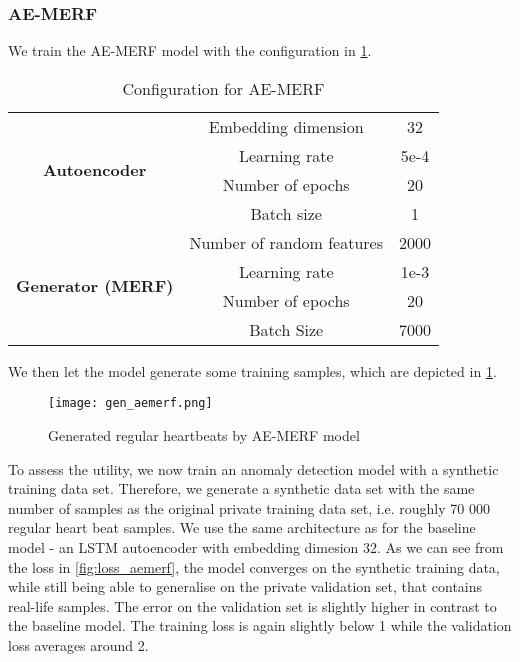 \subsubsection*{AE-MERF}
We train the AE-MERF model with the configuration in \cref{tab:ae_merf_config}.
\begin{table}[H]
    \centering
    \begin{tabular}{|c|c|c|}
        \hline
        \multirow{4}{*}{\textbf{Autoencoder}}& Embedding dimension & 32 \\ 
                                    & Learning rate & 5e-4 \\
                                    & Number of epochs& 20\\
                                    & Batch size & 1\\
        \hline
        \multirow{4}{*}{\textbf{Generator (MERF)}} & Number of random features & 2000 \\
                                        & Learning rate & 1e-3\\
                                        & Number of epochs & 20\\
                                        & Batch Size & 7000 \\
        \hline
    \end{tabular}
    \caption{Configuration for AE-MERF}
    \label{tab:ae_merf_config}
\end{table}
We then let the model generate some training samples, which are depicted in \cref{fig:aemerf_samples}.

\begin{figure}[h]
    \centering
    \texttt{[image: gen\_aemerf.png]}
    \caption{Generated regular heartbeats by AE-MERF model}
    \label{fig:aemerf_samples}
\end{figure}

To assess the utility, we now train an anomaly detection model with a synthetic training data set. Therefore, we generate a synthetic data set with the same number of samples as the original private training data set, i.e. roughly 70 000 regular heart beat samples. We use the same architecture as for the baseline model - an LSTM autoencoder with embedding dimesion 32. As we can see from the loss in \cref{fig:loss_aemerf}, the model converges on the synthetic training data, while still being able to generalise on the private validation set, that contains real-life samples. The error on the validation set is slightly higher in contrast to the baseline model. The training loss is again slightly below 1 while the validation loss averages around 2. 

